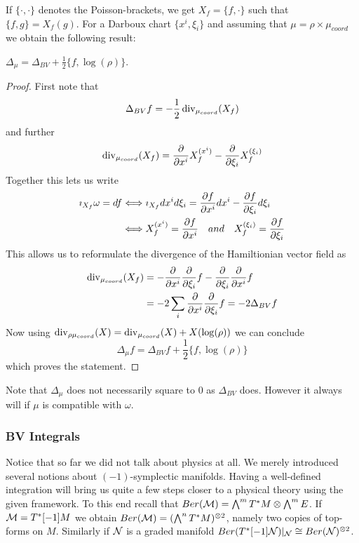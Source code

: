 If $\{\cdot, \cdot\}$ denotes the Poisson-brackets, we get $X_f = \{f, \cdot\}$ such that $\{f,g \} = X_f (g)$. For a Darboux chart $\{x^i, \xi_i\}$ and assuming that $\mu = \rho \times \mu_{coord}$ we obtain the following result:

\begin{lem}
  $\Delta_\mu = \Delta_{BV} + \frac{1}{2} \{f, \log(\rho)\}$.
\begin{proof}
  First note that
  \begin{equation}
    \Delta_{BV} f = - \frac{1}{2} \operatorname{div}_{\mu_{coord}}(X_f)
  \end{equation}
  and further
  \begin{equation}
    \operatorname{div}_{\mu_{coord}}(X_f) = \frac{\partial }{\partial x^i} X_f^{(x^i)} - \frac{\partial }{\partial \xi_i} X_f^{(\xi_i)}
  \end{equation}
  Together this lets us write
  \begin{align}
    \imath_{X_f} \omega = df &\Longleftrightarrow \imath_{X_f} dx^i d\xi_i = \frac{\partial f}{\partial x^i} dx^i - \frac{\partial f}{\partial \xi_i} d\xi_i \\
    & \Longleftrightarrow X_f^{(x^i)} = \frac{\partial f}{\partial x^i} \quad and \quad X_f^{(\xi_i)} = \frac{\partial f}{\partial \xi_i}
  \end{align}
  This allows us to reformulate the divergence of the Hamiltionian vector field as
  \begin{align}
    \operatorname{div}_{\mu_{coord}}(X_f) &= - \frac{\partial }{\partial x^i} \frac{\partial }{\partial \xi_i} f - \frac{\partial }{\partial \xi_i} \frac{\partial }{\partial x^i} f \\
    &= - 2 \sum_i \frac{\partial }{\partial x^i} \frac{\partial }{\partial \xi_i} f = - 2 \Delta_{BV} f
  \end{align}
  Now using $\operatorname{div}_{\rho \mu_{coord}} (X) = \operatorname{div}_{\mu_{coord}} (X) + X(\log(\rho))$ we can conclude
  \begin{equation}
    \Delta_\mu f = \Delta_{BV} f + \frac{1}{2} \{ f, \log(\rho) \}
  \end{equation}
  which proves the statement.
\end{proof}
\end{lem}

\begin{rem}
  Note that $\Delta_\mu$ does not necessarily square to $0$ as $\Delta_{BV}$ does. However it always will if $\mu$ is compatible with $\omega$.
\end{rem}

\subsubsection{BV Integrals}
Notice that so far we did not talk about physics at all. We merely introduced several notions about $(-1)$-symplectic manifolds. Having a well-defined integration will bring us quite a few steps closer to a physical theory using the given framework. To this end recall that $Ber(\mathcal{M}) = \bigwedge^m T^* M \otimes \bigwedge^m E$. If $\mathcal{M} = T^*[-1] M$ we obtain $Ber(\mathcal{M}) = (\bigwedge^n T^*M)^{\otimes 2}$, namely two copies of top-forms on $M$. Similarly if $\mathcal{N}$ is a graded manifold $Ber(T^*[-1]\mathcal{N})|_{\mathcal{N}} \cong Ber(\mathcal{N})^{\otimes 2}$.\\

